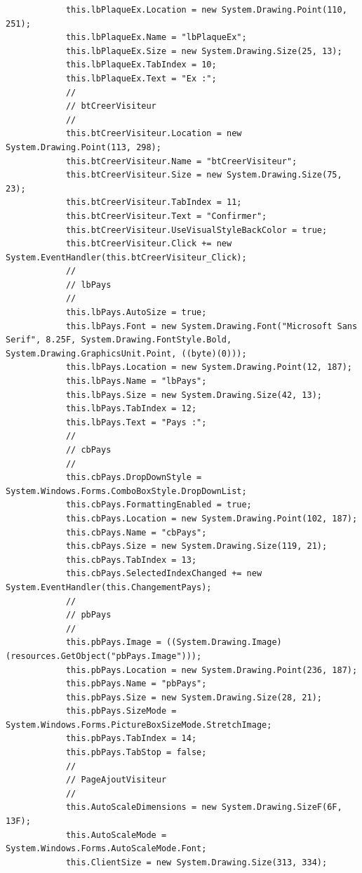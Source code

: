 \documentclass[main.tex]{subfiles}
\begin{document}
\begin{lstlisting}
            this.lbPlaqueEx.Location = new System.Drawing.Point(110, 251);
            this.lbPlaqueEx.Name = "lbPlaqueEx";
            this.lbPlaqueEx.Size = new System.Drawing.Size(25, 13);
            this.lbPlaqueEx.TabIndex = 10;
            this.lbPlaqueEx.Text = "Ex :";
            // 
            // btCreerVisiteur
            // 
            this.btCreerVisiteur.Location = new System.Drawing.Point(113, 298);
            this.btCreerVisiteur.Name = "btCreerVisiteur";
            this.btCreerVisiteur.Size = new System.Drawing.Size(75, 23);
            this.btCreerVisiteur.TabIndex = 11;
            this.btCreerVisiteur.Text = "Confirmer";
            this.btCreerVisiteur.UseVisualStyleBackColor = true;
            this.btCreerVisiteur.Click += new System.EventHandler(this.btCreerVisiteur_Click);
            // 
            // lbPays
            // 
            this.lbPays.AutoSize = true;
            this.lbPays.Font = new System.Drawing.Font("Microsoft Sans Serif", 8.25F, System.Drawing.FontStyle.Bold, System.Drawing.GraphicsUnit.Point, ((byte)(0)));
            this.lbPays.Location = new System.Drawing.Point(12, 187);
            this.lbPays.Name = "lbPays";
            this.lbPays.Size = new System.Drawing.Size(42, 13);
            this.lbPays.TabIndex = 12;
            this.lbPays.Text = "Pays :";
            // 
            // cbPays
            // 
            this.cbPays.DropDownStyle = System.Windows.Forms.ComboBoxStyle.DropDownList;
            this.cbPays.FormattingEnabled = true;
            this.cbPays.Location = new System.Drawing.Point(102, 187);
            this.cbPays.Name = "cbPays";
            this.cbPays.Size = new System.Drawing.Size(119, 21);
            this.cbPays.TabIndex = 13;
            this.cbPays.SelectedIndexChanged += new System.EventHandler(this.ChangementPays);
            // 
            // pbPays
            // 
            this.pbPays.Image = ((System.Drawing.Image)(resources.GetObject("pbPays.Image")));
            this.pbPays.Location = new System.Drawing.Point(236, 187);
            this.pbPays.Name = "pbPays";
            this.pbPays.Size = new System.Drawing.Size(28, 21);
            this.pbPays.SizeMode = System.Windows.Forms.PictureBoxSizeMode.StretchImage;
            this.pbPays.TabIndex = 14;
            this.pbPays.TabStop = false;
            // 
            // PageAjoutVisiteur
            // 
            this.AutoScaleDimensions = new System.Drawing.SizeF(6F, 13F);
            this.AutoScaleMode = System.Windows.Forms.AutoScaleMode.Font;
            this.ClientSize = new System.Drawing.Size(313, 334);

\end{lstlisting}
\end{document}
